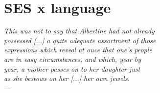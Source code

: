 \documentclass[../thesis.tex]{subfiles}
\begin{document}
\chapter{SES x language}
\label{ch:ses_ling}
\begin{flushright}{\slshape    
  This was not to say that Albertine had not already\\
  possessed [...] a quite adequate assortment  of those\\
  expressions which reveal at once that one's people\\
  are in easy circumstances, and which, year by\\
  year, a mother passes on to her daughter just\\
  as she bestows on her [...] %
  her own jewels.
  } \\ \medskip
  --- ~\cite{ProustGuermantesWay1927} %
\end{flushright}
\end{document}
